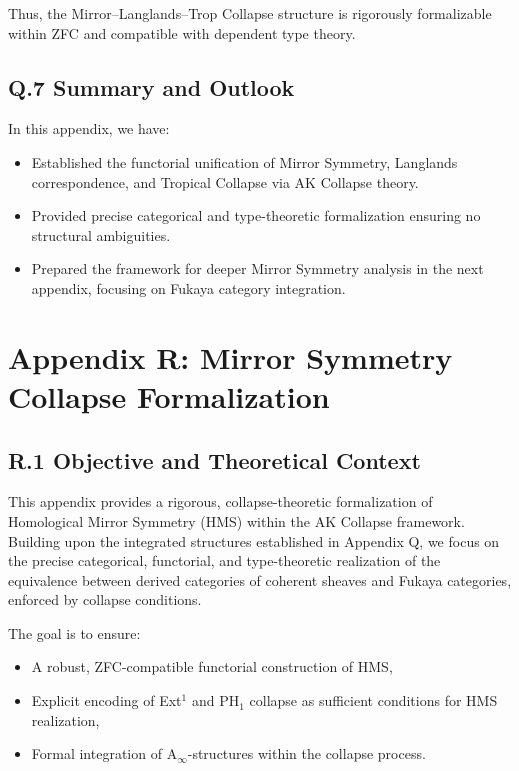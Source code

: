 \documentclass[11pt]{article}
\begin{document}
Thus, the Mirror–Langlands–Trop Collapse structure is rigorously formalizable within ZFC and compatible with dependent type theory.

\subsection*{Q.7 Summary and Outlook}

In this appendix, we have:

\begin{itemize}
  \item Established the functorial unification of Mirror Symmetry, Langlands correspondence, and Tropical Collapse via AK Collapse theory.
  \item Provided precise categorical and type-theoretic formalization ensuring no structural ambiguities.
  \item Prepared the framework for deeper Mirror Symmetry analysis in the next appendix, focusing on Fukaya category integration.
\end{itemize}




\section*{Appendix R: Mirror Symmetry Collapse Formalization}

\subsection*{R.1 Objective and Theoretical Context}

This appendix provides a rigorous, collapse-theoretic formalization of Homological Mirror Symmetry (HMS) within the AK Collapse framework. Building upon the integrated structures established in Appendix Q, we focus on the precise categorical, functorial, and type-theoretic realization of the equivalence between derived categories of coherent sheaves and Fukaya categories, enforced by collapse conditions.

The goal is to ensure:
\begin{itemize}
  \item A robust, ZFC-compatible functorial construction of HMS,
  \item Explicit encoding of Ext$^1$ and PH$_1$ collapse as sufficient conditions for HMS realization,
  \item Formal integration of A$_\infty$-structures within the collapse process.
\end{itemize}
\end{document}
